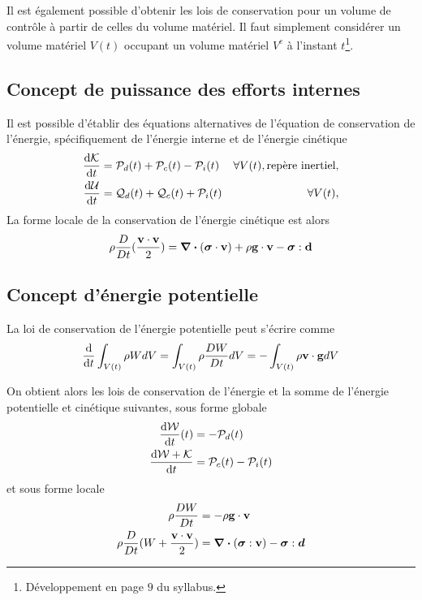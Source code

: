       Il est également possible d'obtenir les lois de conservation pour un volume de contrôle à partir de celles du volume matériel. Il faut simplement considérer un volume matériel $V(t)$ occupant un volume matériel $V^c$ à l'instant $t$\footnote{Développement en page $9$ du syllabus.}.

    \subsection{Concept de puissance des efforts internes}
      Il est possible d'établir des équations alternatives de l'équation de conservation de l'énergie, spécifiquement de l'énergie interne et de l'énergie cinétique
      \begin{equation}\begin{aligned}
        \dv{\mathcal{K}}{t}(t) &= \mathcal{P}_d(t) + \mathcal{P}_c(t) - \mathcal{P}_i(t) & \forall V(t), \textrm{repère inertiel},\\
        \dv{\mathcal{U}}{t}(t) &= \mathcal{Q}_d(t) + \mathcal{Q}_c(t) + \mathcal{P}_i(t) & \forall V(t),
      \end{aligned}\end{equation}
      La forme locale de la conservation de l'énergie cinétique est alors
      \begin{equation}
        \rho \frac{D }{D t}(\frac{\vb{v}\cdot \vb{v}}{2}) = \div (\boldsymbol{\sigma} \cdot \vb{v}) + \rho \vb{g} \cdot \vb{v} - \boldsymbol{\sigma} : \vb{d}
      \end{equation}

    \subsection{Concept d'énergie potentielle}
      La loi de conservation de l'énergie potentielle peut s'écrire comme
      \begin{equation}
        \dv{t}\int_{V(t)} \rho W dV = \int_{V(t)} \rho \frac{D W}{D t} dV = - \int_{V(t)} \rho \vb{v} \cdot \vb{g} dV
      \end{equation}

      On obtient alors les lois de conservation de l'énergie et la somme de l'énergie potentielle et cinétique suivantes, sous forme globale
      \begin{equation}\begin{aligned}
          \dv{\mathcal{W}}{t} {}(t) &= -\mathcal{P}_d(t)\\
          \dv{\mathcal{W} + \mathcal{K}}{t} &= \mathcal{P}_c(t) - \mathcal{P}_i(t)
      \end{aligned}\end{equation}
      et sous forme locale
      \begin{align}
        \rho \frac{D W}{D t} &= -\rho \vb{g} \cdot \vb{v}\\
        \rho \frac{D }{D t}(W + \frac{\vb{v} \cdot\vb{v}}{2}) &= \div (\boldsymbol{\sigma} : \vb{v}) - \boldsymbol{\sigma} : \boldsymbol{d}\nonumber
      \end{align}

